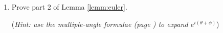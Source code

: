 \begin{exercises}
\begin{enumerate}
	  	
	  \item Prove part 2 of Lemma \ref{lemm:euler}.\par
	  (\emph{Hint: use the multiple-angle formulae (page \pageref{sec:multangle}) to expand $e^{i(\theta+\phi)}$})
	  	
	 	
	\end{enumerate}
 	
  
  
  
%   
%   

\end{exercises}
